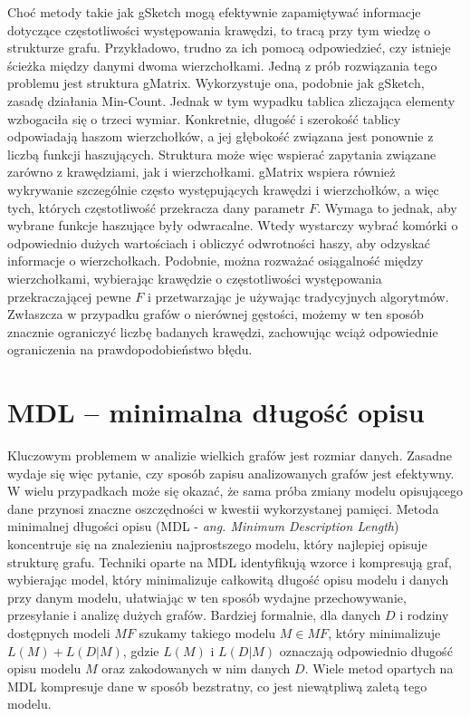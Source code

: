     Choć metody takie jak gSketch mogą efektywnie zapamiętywać informacje dotyczące częstotliwości występowania krawędzi, to tracą przy tym wiedzę o strukturze grafu. Przykładowo, trudno za ich pomocą odpowiedzieć, czy istnieje ścieżka między danymi dwoma wierzchołkami. Jedną z prób rozwiązania tego problemu jest struktura gMatrix\cite{Khan_Aggarwal_2016}. Wykorzystuje ona, podobnie jak gSketch, zasadę działania Min-Count. Jednak w tym wypadku tablica zliczająca elementy wzbogaciła się o trzeci wymiar. Konkretnie, długość i szerokość tablicy odpowiadają haszom wierzchołków, a jej głębokość związana jest ponownie z liczbą funkcji haszujących. Struktura może więc wspierać zapytania związane zarówno z krawędziami, jak i wierzchołkami. gMatrix wspiera również wykrywanie szczególnie często występujących krawędzi i wierzchołków, a więc tych, których częstotliwość przekracza dany parametr $F$. Wymaga to jednak, aby wybrane funkcje haszujące były odwracalne. Wtedy wystarczy wybrać komórki o odpowiednio dużych wartościach i obliczyć odwrotności haszy, aby odzyskać informacje o wierzchołkach. Podobnie, można rozważać osiągalność między wierzchołkami, wybierając krawędzie o częstotliwości występowania przekraczającej pewne $F$ i przetwarzając je używając tradycyjnych algorytmów. Zwłaszcza w przypadku grafów o nierównej gęstości, możemy w ten sposób znacznie ograniczyć liczbę badanych krawędzi, zachowując wciąż odpowiednie ograniczenia na prawdopodobieństwo błędu.

\section{MDL -- minimalna długość opisu}
    Kluczowym problemem w analizie wielkich grafów jest rozmiar danych. Zasadne wydaje się więc pytanie, czy sposób zapisu analizowanych grafów jest efektywny. W wielu przypadkach może się okazać, że sama próba zmiany modelu opisującego dane przynosi znaczne oszczędności w kwestii wykorzystanej pamięci. Metoda minimalnej długości opisu (MDL - \emph{ang. Minimum Description Length}) koncentruje się na znalezieniu najprostszego modelu, który najlepiej opisuje strukturę grafu. Techniki oparte na MDL identyfikują wzorce i kompresują graf, wybierając model, który minimalizuje całkowitą długość opisu modelu i danych przy danym modelu, ułatwiając w ten sposób wydajne przechowywanie, przesyłanie i analizę dużych grafów. Bardziej formalnie, dla danych $D$ i rodziny dostępnych modeli $MF$ szukamy takiego modelu $M \in MF$, który minimalizuje $L(M) + L(D|M)$, gdzie $L(M)$ i $L(D|M)$ oznaczają odpowiednio długość opisu modelu $M$ oraz zakodowanych w nim danych $D$. Wiele metod opartych na MDL kompresuje dane w sposób bezstratny, co jest niewątpliwą zaletą tego modelu. 

